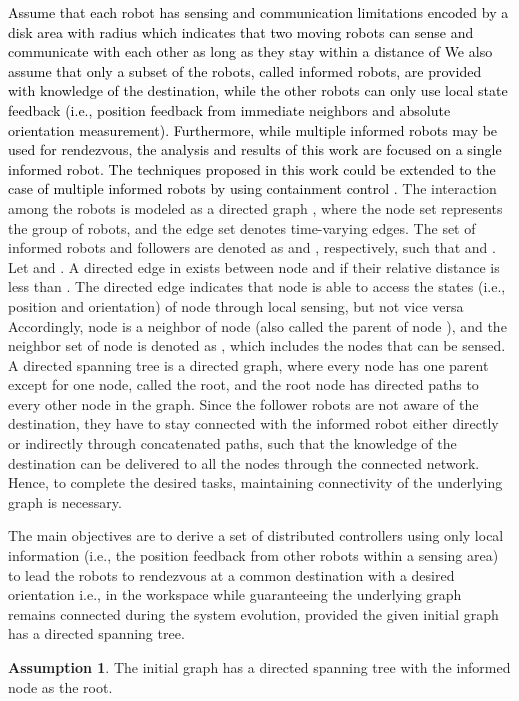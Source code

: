 \documentclass[english]{IOS-Book-Article}
\theoremstyle{definition}
\theoremstyle{definition}
\newtheorem{assumption}{Assumption}
\begin{document}
\textcolor{black}{Assume that each robot has sensing and communication
limitations encoded by a disk area with radius  which indicates
that two moving robots can sense and communicate with each other as
long as they stay within a distance of  We also assume that only
a subset of the robots, called informed robots, are provided with
knowledge of the destination, while the other robots can only use
local state feedback (i.e., position feedback from immediate neighbors
and absolute orientation measurement). Furthermore, while multiple
informed robots may be used for rendezvous, the analysis and results
of this work are focused on a single informed robot. The techniques
proposed in this work could be extended to the case of multiple informed
robots by using containment control \cite{Kan.Klotz.ea2013,Kan.Mehta.ea2014,Cao2009}.
}The interaction among the robots is modeled as a directed graph ,
where the node set  represents
the group of robots, and the edge set  denotes time-varying
edges. The set of informed robots and followers are denoted as 
and , respectively, such that 
and . Let 
and . A directed edge
  in 
exists between node  and  if their relative distance 
is less than . The directed edge  indicates
that node  is able to access the states (i.e., position and orientation)
of node  through local sensing, but not vice versa Accordingly,
node  is a neighbor of node  (also called the parent of node
), and the neighbor set of node  is denoted as ,
which includes the nodes that can be sensed. A directed spanning tree
is a directed graph, where every node has one parent except for one
node, called the root, and the root node has directed paths to every
other node in the graph. Since the follower robots are not aware of
the destination, they have to stay connected with the informed robot
either directly or indirectly through concatenated paths, such that
the knowledge of the destination can be delivered to all the nodes
through the connected network. Hence, to complete the desired tasks,
maintaining connectivity of the underlying graph is necessary. 

The main objectives are to derive a set of distributed controllers
using only local information (i.e., the position feedback from other
robots within a sensing area) to lead the robots to rendezvous at
a common destination  with a desired orientation 
i.e.,   in the workspace  while guaranteeing
the underlying graph  remains connected
during the system evolution, provided the given initial graph has
a directed spanning tree. 
\begin{assumption}
\label{Ass1}The initial graph  has a
directed spanning tree with the informed node as the root.
\end{assumption}
\end{document}
